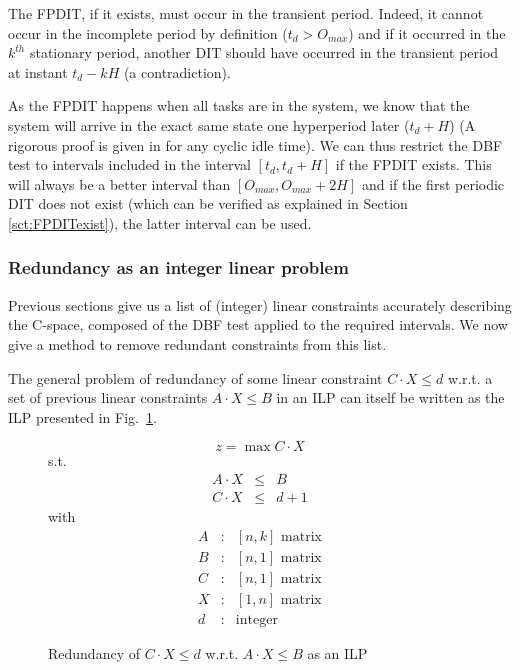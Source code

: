 \documentclass[conference]{IEEEtran}
\begin{document}
The FPDIT, if it exists, must occur in the transient period. Indeed, it cannot occur in the incomplete period by definition ($t_d > O_{max}$) and if it occurred in the $k^{th}$ stationary period, another DIT should have occurred in the transient period at instant $t_d - k H$ (a contradiction).

As the FPDIT happens when all tasks are in the system, we know that the system will arrive in the exact same state one hyperperiod later ($t_d + H$) (A rigorous proof is given in \cite{choquet2004minimal} for any cyclic idle time). We can thus restrict the DBF test to intervals included in the interval $[t_d, t_d + H]$ if the FPDIT exists. This will always be a better interval than $[O_{max}, O_{max} + 2H]$ and if the first periodic DIT does not exist (which can be verified as explained in Section \ref{sct:FPDITexist}), the latter interval can be used.

\subsubsection{Redundancy as an integer linear problem}

Previous sections give us a list of (integer) linear constraints accurately describing the C-space, composed of the DBF test applied to the required intervals. We now give a method to remove redundant constraints from this list.

The general problem of redundancy of some linear constraint $C \cdot X \leq d$
w.r.t. a set of previous linear constraints $A \cdot X \leq B$ in an ILP can
itself be written as the ILP presented in Fig.~\ref{fig:redILP}.

\begin{figure}[h]
$$z = \max C \cdot X$$
s.t.
\[
\begin{array}{rcc}
  A \cdot X &\leq & B \\
  C \cdot X &\leq & d + 1
\end{array}
\]
with
\[
  \begin{array}{ccc}
    A & : & [n,k] \text{ matrix}\\
    B & : & [n,1] \text{ matrix}\\
    C & : & [n,1] \text{ matrix}\\
    X & : & [1,n] \text{ matrix}\\
    d & : & \text{integer}
  \end{array}
\]
\caption{Redundancy of $C \cdot X \leq d$ w.r.t. $A \cdot X \leq B$ as an ILP}
\label{fig:redILP}
\end{figure}
\end{document}
